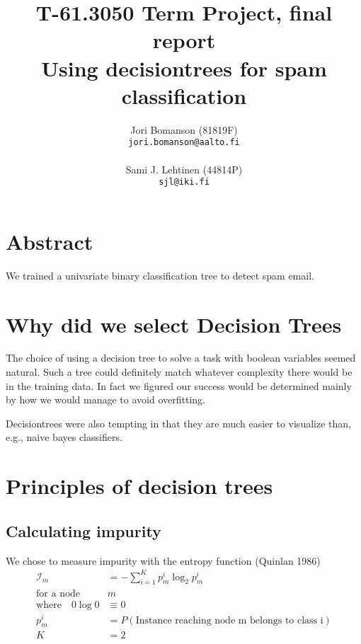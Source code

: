 \documentclass[a4paper,10pt]{article}
\title{T-61.3050 Term Project, final report\\
       Using decisiontrees for spam classification} %
\author{Jori Bomanson (81819F) \\
  {\tt jori.bomanson@aalto.fi} \\
  \\
  Sami J. Lehtinen (44814P)\\ 
  {\tt sjl@iki.fi} \\
}
\begin{document}

\maketitle
\thispagestyle{empty}
\pagebreak
{}

\section{Abstract}
We trained a univariate binary classification tree to detect spam email.


\section{Why did we select Decision Trees}

The choice of using a decision tree to solve a task with boolean variables
seemed natural. Such a tree could definitely match whatever complexity there
would be in the training data.
In fact we figured our success would be determined mainly by how we would
manage to avoid overfitting.

Decisiontrees were also tempting in that they are much easier to
visualize than, e.g., naive bayes classifiers.

\section{Principles of decision trees}

\subsection{Calculating impurity}

We chose to measure impurity  with the entropy function (Quinlan 1986)
\begin{equation*}
\begin{split}
\mathcal{I}_m &= - \sum_{i=1}^K p_m^i \log_2 p_m^i  \\
\text{for a node} \quad & m  \\
\text{where} \quad 0 \log 0 &\equiv 0  \\
p_m^i &= P(\text{Instance reaching node m belongs to class i})  \\
K &= 2
\end{split}
\end{equation*}
\end{document}
